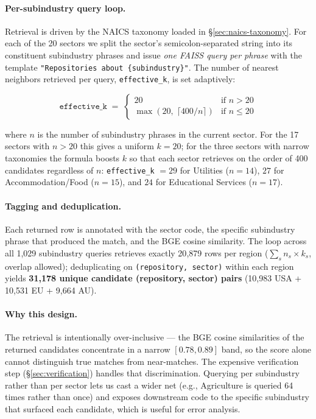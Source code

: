 \documentclass{article}
\begin{document}
\paragraph{Per-subindustry query loop.}
Retrieval is driven by the NAICS taxonomy loaded in
\S\ref{sec:naics-taxonomy}. For each of the 20 sectors we split the
sector's semicolon-separated string into its constituent subindustry
phrases and issue \emph{one FAISS query per phrase} with the template
\texttt{"Repositories about \{subindustry\}"}. The number of nearest
neighbors retrieved per query, \texttt{effective\_k}, is set
adaptively:

\begin{equation*}
  \mathtt{effective\_k} \;=\;
  \begin{cases}
    20 & \text{if } n > 20 \\
    \max\!\left(20,\;\lceil 400 / n \rceil\right) & \text{if } n \leq 20
  \end{cases}
\end{equation*}

where $n$ is the number of subindustry phrases in the current sector.
For the 17 sectors with $n > 20$ this gives a uniform $k = 20$; for
the three sectors with narrow taxonomies the formula boosts $k$ so
that each sector retrieves on the order of 400 candidates regardless
of $n$: \texttt{effective\_k} $= 29$ for Utilities ($n=14$), $27$ for
Accommodation/Food ($n=15$), and $24$ for Educational Services
($n=17$).

\paragraph{Tagging and deduplication.}
Each returned row is annotated with the sector code, the specific
subindustry phrase that produced the match, and the BGE cosine
similarity. The loop across all 1{,}029 subindustry queries retrieves
exactly 20{,}879 rows per region ($\sum_s n_s \times k_s$, overlap
allowed); deduplicating on \texttt{(repository, sector)} within each
region yields \textbf{31{,}178 unique candidate (repository, sector)
pairs} (10{,}983 USA + 10{,}531 EU + 9{,}664 AU).

\paragraph{Why this design.}
The retrieval is intentionally over-inclusive --- the BGE cosine
similarities of the returned candidates concentrate in a narrow
$[0.78, 0.89]$ band, so the score alone cannot distinguish true
matches from near-matches. The expensive verification step
(\S\ref{sec:verification}) handles that discrimination. Querying per
subindustry rather than per sector lets us cast a wider net (e.g.,
Agriculture is queried 64 times rather than once) and exposes
downstream code to the specific subindustry that surfaced each
candidate, which is useful for error analysis.
\end{document}
